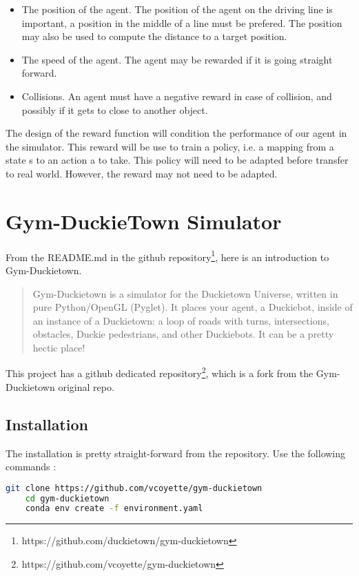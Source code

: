 \documentclass[12pt]{article}
\begin{document}
\begin{itemize}
    \item The position of the agent. The position of the agent on the driving line is important, a position in the middle of a line must be prefered. The position may also be used to compute the distance to a target position.
    \item The speed of the agent. The agent may be rewarded if it is going straight forward. 
    \item Collisions. An agent must have a negative reward in case of collision, and possibly if it gets to close to another object.
\end{itemize}

The design of the reward function will condition the performance of our agent in the simulator. This reward will be use to train a policy, i.e. a mapping from a state s to an action a to take. This policy will need to be adapted before transfer to real world. However, the reward may not need to be adapted. 

\section{Gym-DuckieTown Simulator}

From the README.md in the github repository\footnote{https://github.com/duckietown/gym-duckietown}, here is an introduction to Gym-Duckietown. 

 \begin{quotation}
  Gym-Duckietown is a simulator for the Duckietown Universe, written in pure Python/OpenGL (Pyglet). It places your agent, a Duckiebot, inside of an instance of a Duckietown: a loop of roads with turns, intersections, obstacles, Duckie pedestrians, and other Duckiebots. It can be a pretty hectic place!
 \end{quotation}

 This project has a github dedicated repository\footnote{https://github.com/vcoyette/gym-duckietown}, which is a fork from the Gym-Duckietown original repo.

\subsection{Installation}
The installation is pretty straight-forward from the repository. Use the following commands :

\begin{lstlisting}[language=bash]
    git clone https://github.com/vcoyette/gym-duckietown
    cd gym-duckietown
    conda env create -f environment.yaml
\end{lstlisting}
\end{document}
